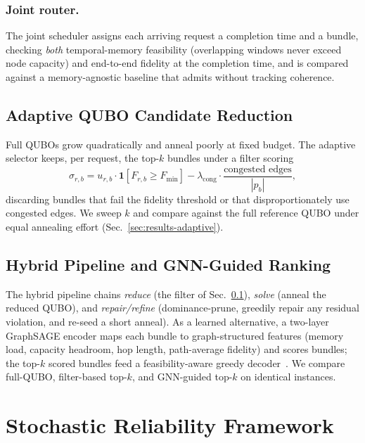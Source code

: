 \documentclass[10pt,a4paper]{article}
\begin{document}
\subsubsection{Joint router.}
The joint scheduler assigns each arriving request a completion time
and a bundle, checking \emph{both} temporal-memory feasibility
(overlapping windows never exceed node capacity) and end-to-end
fidelity at the completion time, and is compared against a
memory-agnostic baseline that admits without tracking coherence.

\subsection{Adaptive QUBO Candidate Reduction}
\label{sec:adaptive-qubo}

Full QUBOs grow quadratically and anneal poorly at fixed budget.  The
adaptive selector keeps, per request, the top-$k$ bundles under a
filter scoring
\begin{equation}
  \sigma_{r,b} = u_{r,b} \cdot \mathbf{1}[F_{r,b} \ge F_{\min}]
    - \lambda_{\text{cong}} \cdot \frac{\text{congested edges}}{|p_b|},
\end{equation}
discarding bundles that fail the fidelity threshold or that
disproportionately use congested edges.  We sweep $k$ and compare
against the full reference QUBO under equal annealing effort
(Sec.~\ref{sec:results-adaptive}).

\subsection{Hybrid Pipeline and GNN-Guided Ranking}
\label{sec:hybrid}

The hybrid pipeline chains \emph{reduce} (the filter of
Sec.~\ref{sec:adaptive-qubo}), \emph{solve} (anneal the reduced QUBO),
and \emph{repair/refine} (dominance-prune, greedily repair any residual
violation, and re-seed a short anneal).  As a learned alternative, a
two-layer GraphSAGE encoder maps each bundle to graph-structured
features (memory load, capacity headroom, hop length, path-average
fidelity) and scores bundles; the top-$k$ scored bundles feed a
feasibility-aware greedy decoder~\cite{rusek2020routenets,mao2017routing}.
We compare full-QUBO, filter-based top-$k$, and GNN-guided top-$k$ on
identical instances.

\section{Stochastic Reliability Framework}
\label{sec:reliability}
\end{document}
